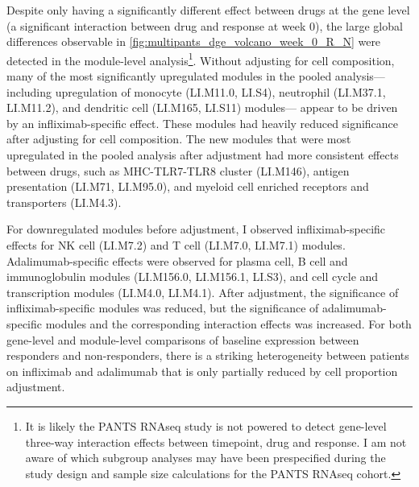Despite only  having a significantly different effect between drugs at the gene level (a significant interaction between drug and response at week 0), 
the large global differences observable in \cref{fig:multipants_dge_volcano_week_0_R_N} were detected in the module-level analysis\footnote{
    It is likely the \gls{PANTS} \gls{RNAseq} study is not powered to detect gene-level three-way interaction effects between timepoint, drug and response.
    I am not aware of which subgroup analyses may have been prespecified during the study design and sample size calculations for the \gls{PANTS} \gls{RNAseq} cohort.
}.
Without adjusting for cell composition, many of the most significantly upregulated modules in the pooled analysis---%
including upregulation of monocyte (LI.M11.0, LI.S4), neutrophil (LI.M37.1, LI.M11.2), and dendritic cell (LI.M165, LI.S11) modules---%
appear to be driven by an infliximab-specific effect.
These modules had heavily reduced significance after adjusting for cell composition.
The new modules that were most upregulated in the pooled analysis after adjustment had more consistent effects between drugs, 
such as MHC-TLR7-TLR8 cluster (LI.M146), antigen presentation (LI.M71, LI.M95.0), and myeloid cell enriched receptors and transporters (LI.M4.3).

For downregulated modules before adjustment, I observed infliximab-specific effects for \gls{NK} cell (LI.M7.2) and T cell (LI.M7.0, LI.M7.1) modules.
Adalimumab-specific effects were observed for plasma cell, B cell and immunoglobulin modules (LI.M156.0, LI.M156.1, LI.S3), and cell cycle and transcription modules (LI.M4.0, LI.M4.1).
After adjustment, the significance of infliximab-specific modules was reduced, 
but the significance of adalimumab-specific modules and the corresponding interaction effects was increased.
For both gene-level and module-level comparisons of baseline expression between responders and non-responders, there is a striking heterogeneity between patients on infliximab and adalimumab that is only partially reduced by cell proportion adjustment.

